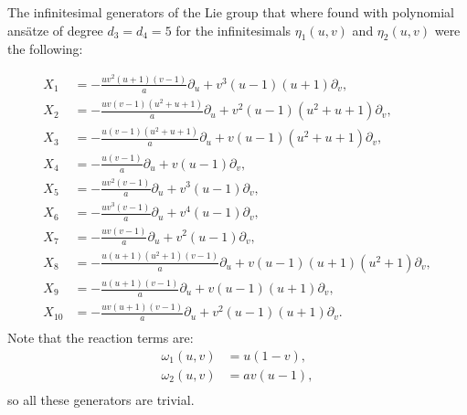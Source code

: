 The infinitesimal generators of the Lie group that where found with polynomial ans\"atze of degree $d_3=d_4=5$ for the infinitesimals $\eta_1(u,v)$ and $\eta_2(u,v)$ were the following:

\begin{align*}
X_{1}&=- \frac{u v^{2} \left(u + 1\right) \left(v - 1\right)}{a}\partial_u+v^{3} \left(u - 1\right) \left(u + 1\right)\partial_v,\\
X_{2}&=- \frac{u v \left(v - 1\right) \left(u^{2} + u + 1\right)}{a}\partial_u+v^{2} \left(u - 1\right) \left(u^{2} + u + 1\right)\partial_v,\\
X_{3}&=- \frac{u \left(v - 1\right) \left(u^{2} + u + 1\right)}{a}\partial_u+v \left(u - 1\right) \left(u^{2} + u + 1\right)\partial_v,\\
X_{4}&=- \frac{u \left(v - 1\right)}{a}\partial_u+v \left(u - 1\right)\partial_v,\\
X_{5}&=- \frac{u v^{2} \left(v - 1\right)}{a}\partial_u+v^{3} \left(u - 1\right)\partial_v,\\
X_{6}&=- \frac{u v^{3} \left(v - 1\right)}{a}\partial_u+v^{4} \left(u - 1\right)\partial_v,\\
X_{7}&=- \frac{u v \left(v - 1\right)}{a}\partial_u+v^{2} \left(u - 1\right)\partial_v,\\
X_{8}&=- \frac{u \left(u + 1\right) \left(u^{2} + 1\right) \left(v - 1\right)}{a}\partial_u+v \left(u - 1\right) \left(u + 1\right) \left(u^{2} + 1\right)\partial_v,\\
X_{9}&=- \frac{u \left(u + 1\right) \left(v - 1\right)}{a}\partial_u+v \left(u - 1\right) \left(u + 1\right)\partial_v,\\
X_{10}&=- \frac{u v \left(u + 1\right) \left(v - 1\right)}{a}\partial_u+v^{2} \left(u - 1\right) \left(u + 1\right)\partial_v.\\
\end{align*}
Note that the reaction terms are:
\begin{align*}
\omega_1(u,v)&=u \left(1 - v\right),\\
\omega_2(u,v)&=a v \left(u - 1\right),\\
\end{align*}
so all these generators are trivial. 